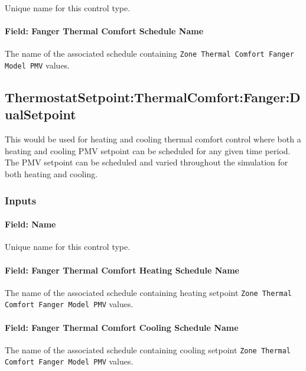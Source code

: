Unique name for this control type.

\paragraph{Field: Fanger Thermal Comfort Schedule Name}\label{field-fanger-thermal-comfort-schedule-name-2}

The name of the associated schedule containing \lstinline!Zone Thermal Comfort Fanger Model PMV! values.

\subsection{ThermostatSetpoint:ThermalComfort:Fanger:DualSetpoint}\label{thermostatsetpointthermalcomfortfangerdualsetpoint}

This would be used for heating and cooling thermal comfort control where both a heating and cooling PMV setpoint can be scheduled for any given time period. The PMV setpoint can be scheduled and varied throughout the simulation for both heating and cooling.

\subsubsection{Inputs}\label{inputs-13-017}

\paragraph{Field: Name}\label{field-name-11-016}

Unique name for this control type.

\paragraph{Field: Fanger Thermal Comfort Heating Schedule Name}\label{field-fanger-thermal-comfort-heating-schedule-name}

The name of the associated schedule containing heating setpoint \lstinline!Zone Thermal Comfort Fanger Model PMV! values.

\paragraph{Field: Fanger Thermal Comfort Cooling Schedule Name}\label{field-fanger-thermal-comfort-cooling-schedule-name}

The name of the associated schedule containing cooling setpoint \lstinline!Zone Thermal Comfort Fanger Model PMV! values.

